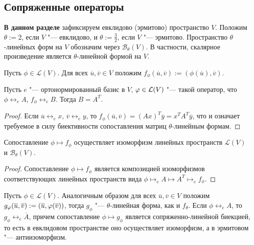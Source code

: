 \subsection{Сопряженные операторы}

\textbf{В данном разделе} зафиксируем евклидово (эрмитово) пространство $V$. Положим $\theta := 2$, если $V$ "--- евклидово, и $\theta := \frac{3}{2}$, если $V$ "--- эрмитово. Пространство $\theta$-линейных форм на $V$ обозначим через $\mathcal{B}_\theta(V)$. В частности, скалярное произведение является $\theta$-линейной формой на $V$. 

\begin{definition}
	Пусть $\phi \in \mathcal{L}(V)$. Для всех $\overline{u}, \overline{v} \in V$ положим $f_\phi(\overline{u}, \overline{v}) := (\phi(\overline{u}), \overline{v})$.
\end{definition}

\begin{proposition}
	Пусть $e$ "--- ортонормированный базис в $V$, $\phi \hm{\in} \mathcal{L}(V)$ "--- такой оператор, что $\phi \leftrightarrow_e A$, $f_\phi \leftrightarrow_e B$. Тогда $B = A^T$.
\end{proposition}

\begin{proof}
	Если $\overline{u} \leftrightarrow_e x$, $\overline{v} \leftrightarrow_e y$, то $f_\phi(\overline{u}, \overline{v}) = (Ax)^T\overline{y} = x^TA^T\overline{y}$, что и означает требуемое в силу биективности сопоставления матриц $\theta$-линейным формам.
\end{proof}

\begin{corollary}
	Сопоставление $\phi \mapsto f_\phi$ осуществляет изоморфизм линейных пространств $\mathcal{L}(V)$ и $\mathcal{B}_\theta(V)$.
\end{corollary}

\begin{proof}
	Сопоставление $\phi \mapsto f_\phi$ является композицией изоморфизмов соответствующих линейных пространств вида $\phi \mapsto_e A \mapsto A^T \mapsto_e f_\phi$.
\end{proof}

\begin{note}
	Пусть $\phi \in \mathcal{L}(V)$. Аналогичным образом для всех $\overline{u}, \overline{v} \in V$ положим $g_\phi(\overline{u}, \overline{v}) \hm{:=} (\overline{u}, \phi(\overline{v}))$, тогда $g_\phi$ "--- $\theta$-линейная форма, как и $f_\theta$. Если $\phi \leftrightarrow_e A$, то $g_\phi \leftrightarrow_e \overline{A}$, причем сопоставление $\phi \mapsto g_\phi$ является сопряженно-линейной биекцией, то есть в евклидовом пространстве оно осуществляет изоморфизм, а в эрмитовом "--- антиизоморфизм.
\end{note}


